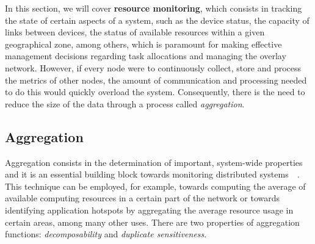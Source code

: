 



In this section, we will cover \textbf{resource monitoring}, which consists in tracking the state of certain aspects of a system, such as the device status, the capacity of links between devices, the status of available resources within a given geographical zone, among others, which is paramount for making effective management decisions regarding task allocations and managing the overlay network. However, if every node were to continuously collect, store and process the metrics of other nodes, the amount of communication and processing needed to do this would quickly overload the system. Consequently, there is the need to reduce the size of the data through a process called \textit{aggregation}.

\subsection{Aggregation}

Aggregation consists in the determination of important, system-wide properties and it is an essential building block towards monitoring distributed systems~\cite{akosThesis}~\cite{DBLP:journals/corr/abs-1110-0725}. This technique can be employed, for example, towards computing the average of available computing resources in a certain part of the network or towards identifying application hotspots by aggregating the average resource usage in certain areas, among many other uses. There are two properties of aggregation functions: \textit{decomposability} and \textit{duplicate sensitiveness}.

